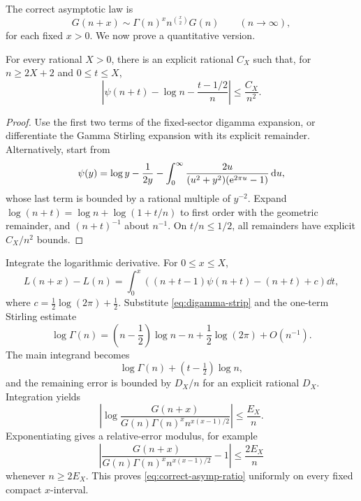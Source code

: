 The correct asymptotic law is
\begin{equation}\label{eq:correct-asymp-ratio}
 G(n+x)\sim
 \Gamma(n)^x n^{\binom{x}{2}}G(n)
 \qquad(n\to\infty),
\end{equation}
for each fixed \(x>0\).  We now prove a quantitative version.

\begin{lemma}\label{lem:digamma-strip}
For every rational \(X>0\), there is an explicit rational \(C_X\) such that,
for \(n\ge2X+2\) and \(0\le t\le X\),
\begin{equation}\label{eq:digamma-strip}
 \left|
 \psi(n+t)-\log n-\frac{t-1/2}{n}
 \right|\le\frac{C_X}{n^2}.
\end{equation}
\end{lemma}

\begin{proof}
Use the first two terms of the fixed-sector digamma expansion, or differentiate
the Gamma Stirling expansion with its explicit remainder.  Alternatively,
start from
\[
 \psi(y)=\log y-\frac1{2y}
 -\int_0^\infty \frac{2u}{(u^2+y^2)(\mathrm e^{2\pi u}-1)}\,\mathrm d u,
\]
whose last term is bounded by a rational multiple of \(y^{-2}\).  Expand
\(\log(n+t)=\log n+\log(1+t/n)\) to first order with the geometric remainder,
and \((n+t)^{-1}\) about \(n^{-1}\).  On \(t/n\le1/2\), all remainders have
explicit \(C_X/n^2\) bounds.
\end{proof}

Integrate the logarithmic derivative.  For \(0\le x\le X\),
\begin{equation}\label{eq:Ldifference-integral}
 L(n+x)-L(n)=\int_0^x
 \left((n+t-1)\psi(n+t)-(n+t)+c\right)\dd t,
\end{equation}
where \(c=\frac12\log(2\pi)+\frac12\).  Substitute
\cref{eq:digamma-strip} and the one-term Stirling estimate
\begin{equation}\label{eq:loggamma-one-term}
 \log\Gamma(n)=
 \left(n-\frac12\right)\log n-n+\frac12\log(2\pi)
 +O(n^{-1}).
\end{equation}
The main integrand becomes
\[
 \log\Gamma(n)+(t-\tfrac12)\log n,
\]
and the remaining error is bounded by \(D_X/n\) for an explicit rational
\(D_X\).  Integration yields
\begin{equation}\label{eq:ratio-log-error}
 \left|
 \log\frac{G(n+x)}
 {G(n)\Gamma(n)^x n^{x(x-1)/2}}
 \right|
 \le\frac{E_X}{n}.
\end{equation}
Exponentiating gives a relative-error modulus, for example
\begin{equation}\label{eq:ratio-relative-error}
 \left|
 \frac{G(n+x)}{G(n)\Gamma(n)^x n^{x(x-1)/2}}-1
 \right|
 \le \frac{2E_X}{n}
\end{equation}
whenever \(n\ge2E_X\).  This proves \cref{eq:correct-asymp-ratio} uniformly on
every fixed compact \(x\)-interval.

